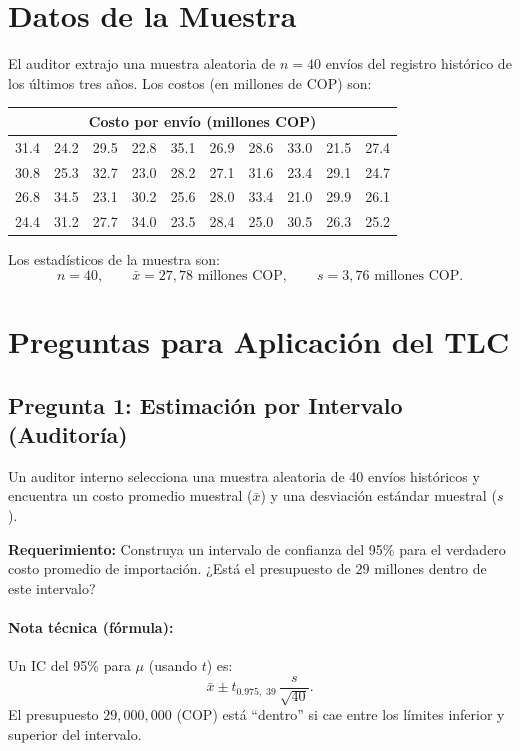 \documentclass[11pt, letterpaper]{article}
\begin{document}
\section{Datos de la Muestra}

El auditor extrajo una muestra aleatoria de $n = 40$ envíos del registro histórico de los últimos tres años. Los costos (en millones de COP) son:

\begin{center}
\small
\renewcommand{\arraystretch}{1.15}
\begin{tabular}{cccccccccc}
\toprule
\multicolumn{10}{c}{\textbf{Costo por envío (millones COP)}} \\
\midrule
31.4 & 24.2 & 29.5 & 22.8 & 35.1 & 26.9 & 28.6 & 33.0 & 21.5 & 27.4 \\
30.8 & 25.3 & 32.7 & 23.0 & 28.2 & 27.1 & 31.6 & 23.4 & 29.1 & 24.7 \\
26.8 & 34.5 & 23.1 & 30.2 & 25.6 & 28.0 & 33.4 & 21.0 & 29.9 & 26.1 \\
24.4 & 31.2 & 27.7 & 34.0 & 23.5 & 28.4 & 25.0 & 30.5 & 26.3 & 25.2 \\
\bottomrule
\end{tabular}
\end{center}

Los estadísticos de la muestra son:
\[
n = 40, \qquad \bar{x} = 27{,}78 \text{ millones COP}, \qquad s = 3{,}76 \text{ millones COP}.
\]

\section{Preguntas para Aplicación del TLC}

\subsection*{Pregunta 1: Estimación por Intervalo (Auditoría)}
Un auditor interno selecciona una muestra aleatoria de 40 envíos históricos y encuentra un costo promedio muestral ($\bar{x}$) y una desviación estándar muestral ($s$).

\textbf{Requerimiento:} Construya un intervalo de confianza del 95\% para el verdadero costo promedio de importación.
¿Está el presupuesto de $29$ millones dentro de este intervalo?

\paragraph{Nota técnica (fórmula):}
Un IC del 95\% para $\mu$ (usando $t$) es:
\[
\bar x \pm t_{0.975,\;39}\,\frac{s}{\sqrt{40}}.
\]
El presupuesto $29{,}000{,}000$ (COP) está ``dentro'' si cae entre los límites inferior y superior del intervalo.
\end{document}
